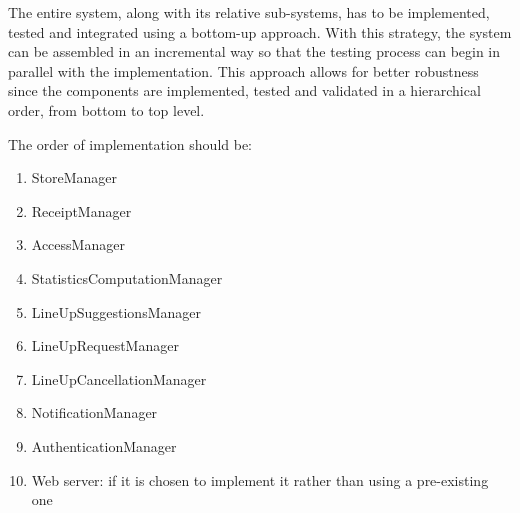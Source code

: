 \documentclass[../../main.tex]{subfiles}
\begin{document}
The entire system, along with its relative sub-systems, has to be implemented, tested and integrated using a bottom-up approach. 
With this strategy, the system can be assembled in an incremental way so that the testing process can begin in parallel with the implementation. 
This approach allows for better robustness since the components are implemented, tested and validated in a hierarchical order, from bottom to top level.


The order of implementation should be:

\begin{enumerate}

	\item StoreManager
	\item ReceiptManager
	\item AccessManager
	\item StatisticsComputationManager
	\item LineUpSuggestionsManager
	\item LineUpRequestManager
	\item LineUpCancellationManager
	\item NotificationManager
	\item AuthenticationManager
	\item Web server: if it is chosen to implement it rather than using a pre-existing one

\end{enumerate}

\end{document}
